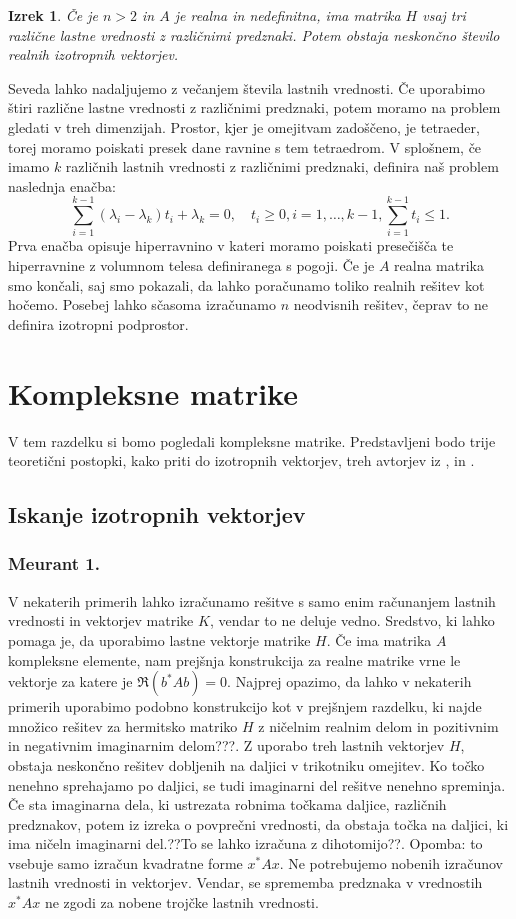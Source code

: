\documentclass[12pt,a4paper]{amsart}
\theoremstyle{definition}
\theoremstyle{plain}
\newtheorem{izrek}[definicija]{Izrek}
\begin{document}
\begin{izrek}
Če je $n>2$ in $A$ je realna in nedefinitna, ima matrika $H$ vsaj tri različne lastne vrednosti z različnimi predznaki. Potem obstaja neskončno število realnih izotropnih vektorjev.
\end{izrek}
Seveda lahko nadaljujemo z večanjem števila lastnih vrednosti. Če uporabimo štiri različne lastne vrednosti z različnimi predznaki, potem moramo na problem gledati v treh dimenzijah. Prostor, kjer je omejitvam zadoščeno, je tetraeder, torej moramo poiskati presek dane ravnine s tem tetraedrom. 
V splošnem, če imamo $k$ različnih lastnih vrednosti z različnimi predznaki, definira naš problem naslednja enačba:
\begin{equation}
\sum_{i=1}^{k-1} (\lambda_i -\lambda_k)t_i +\lambda_k =0, \quad t_i\ge0, i=1, \dots,k-1, \sum_{i=1}^{k-1}t_i \le1.
\end{equation}
Prva enačba opisuje hiperravnino v kateri moramo poiskati  presečišča te hiperravnine z volumnom telesa definiranega s pogoji.
Če je $A$ realna matrika smo končali, saj smo pokazali, da lahko poračunamo toliko realnih rešitev kot hočemo. Posebej lahko sčasoma izračunamo $n$ neodvisnih rešitev, čeprav to ne definira izotropni podprostor. 

\section{Kompleksne matrike}
V tem razdelku si bomo pogledali kompleksne matrike. Predstavljeni bodo trije teoretični postopki, kako priti do izotropnih vektorjev, treh avtorjev iz \cite{meurant},\cite{carden} in \cite{trije}.
\subsection{Iskanje izotropnih vektorjev}
\subsubsection{Meurant 1.}
V nekaterih primerih lahko izračunamo rešitve s samo enim ra\-ču\-na\-njem lastnih vrednosti in vektorjev matrike $K$, vendar to ne deluje vedno. Sredstvo, ki lahko pomaga je, da uporabimo lastne vektorje matrike $H$. Če ima matrika $A$ kompleksne elemente, nam prejšnja konstrukcija za realne matrike vrne le vektorje za katere je $\Re(b^\ast Ab)=0$. Najprej opazimo, da lahko v nekaterih primerih uporabimo podobno konstrukcijo kot v prejšnjem razdelku, ki najde množico rešitev za hermitsko matriko $H$ z ničelnim realnim delom in pozitivnim in negativnim imaginarnim delom???. Z uporabo treh lastnih vektorjev $H$, obstaja neskončno rešitev dobljenih na daljici v trikotniku omejitev. Ko točko nenehno sprehajamo po daljici, se tudi imaginarni del rešitve nenehno spreminja. Če sta imaginarna dela, ki ustrezata robnima točkama daljice, različnih predznakov, potem iz izreka o povprečni vrednosti, da obstaja točka na daljici, ki ima ničeln imaginarni del.??To se lahko izračuna z dihotomijo??. Opomba: to vsebuje samo izračun kvadratne forme $x^\ast Ax$. Ne potrebujemo nobenih izračunov lastnih vrednosti in vektorjev. Vendar, se sprememba predznaka v vrednostih $x^\ast Ax$ ne zgodi za nobene trojčke lastnih vrednosti.
\end{document}
